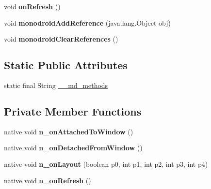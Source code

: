 \begin{DoxyCompactItemize}
void {\bfseries on\+Refresh} ()
\item 
\mbox{\label{classmd5b60ffeb829f638581ab2bb9b1a7f4f3f_1_1ListViewRenderer_a86959f77d1bb744ab196062ffa0c4a1a}} 
void {\bfseries monodroid\+Add\+Reference} (java.\+lang.\+Object obj)
\item 
\mbox{\label{classmd5b60ffeb829f638581ab2bb9b1a7f4f3f_1_1ListViewRenderer_aa025a82d6f89159ae49a0b1b53722295}} 
void {\bfseries monodroid\+Clear\+References} ()
\end{DoxyCompactItemize}
\subsection*{Static Public Attributes}
\begin{DoxyCompactItemize}
\item 
static final String \hyperlink{classmd5b60ffeb829f638581ab2bb9b1a7f4f3f_1_1ListViewRenderer_ad5546d58609fec476ca441ccf586e954}{\+\_\+\+\_\+md\+\_\+methods}
\end{DoxyCompactItemize}
\subsection*{Private Member Functions}
\begin{DoxyCompactItemize}
\item 
\mbox{\label{classmd5b60ffeb829f638581ab2bb9b1a7f4f3f_1_1ListViewRenderer_af1303a48df3b1f7253b9500e2614e515}} 
native void {\bfseries n\+\_\+on\+Attached\+To\+Window} ()
\item 
\mbox{\label{classmd5b60ffeb829f638581ab2bb9b1a7f4f3f_1_1ListViewRenderer_a526706bd1d93c3ab40c34c2a93640b94}} 
native void {\bfseries n\+\_\+on\+Detached\+From\+Window} ()
\item 
\mbox{\label{classmd5b60ffeb829f638581ab2bb9b1a7f4f3f_1_1ListViewRenderer_a88db0ee991444107111a9da6f510dfc5}} 
native void {\bfseries n\+\_\+on\+Layout} (boolean p0, int p1, int p2, int p3, int p4)
\item 
\mbox{\label{classmd5b60ffeb829f638581ab2bb9b1a7f4f3f_1_1ListViewRenderer_a1d4e5a793321e64baef8753338b9feea}} 
native void {\bfseries n\+\_\+on\+Refresh} ()
\end{DoxyCompactItemize}
